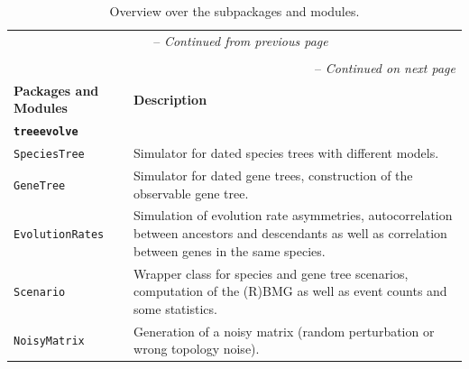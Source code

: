 \documentclass[hidelinks,11pt]{article}
\begin{document}
{\footnotesize
\setlength{\tabcolsep}{6pt}
\renewcommand{\arraystretch}{1.4}
\begin{longtable}{| p{4.0cm} | p{10cm} |}
	\caption{Overview over the subpackages and modules.}\label{tab:module_overview}\\
	\endfirsthead
	\multicolumn{2}{c}{\tablename\ \thetable\ -- \textit{Continued from previous page}}\\
	\multicolumn{2}{c}{}\\
	\hline
	\endhead
	\hline \multicolumn{2}{r}{\tablename\ \thetable\ -- \textit{Continued on next page}} \\
	\endfoot
	\hline
	\endlastfoot
	\hline
	\textbf{Packages and Modules} & \textbf{Description} \\
	\hline
	\multicolumn{2}{|l|}{\textbf{\texttt{treeevolve}}}\\
	\hline
	\texttt{SpeciesTree} & 
	Simulator for dated species trees with different models. \\
	\texttt{GeneTree} & 
	Simulator for dated gene trees, construction of the observable gene tree. \\
	\texttt{EvolutionRates} & 
	Simulation of evolution rate asymmetries, autocorrelation between ancestors and descendants as well as correlation between genes in the same species. \\
	\texttt{Scenario} & 
	Wrapper class for species and gene tree scenarios, computation of the (R)BMG as well as event counts and some statistics. \\
	\texttt{NoisyMatrix} & 
	Generation of a noisy matrix (random perturbation or wrong topology noise). \\
	\hline

\end{longtable}}
\end{document}
